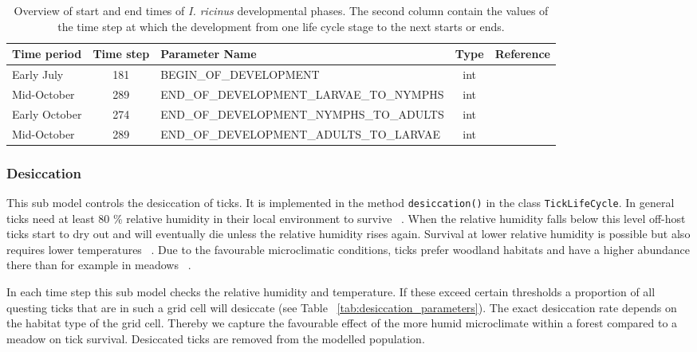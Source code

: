 \documentclass[a4paper, 11pt]{scrartcl}
\newcommand{\inlinecode}[1]{\texttt{\small #1}}
\begin{document}
\begin{table}[h!]
\caption[Overview of start and end times of \emph{I. ricinus} developmental phases.]{Overview of start and end times of \emph{I. ricinus} developmental phases. The second column contain the values of the time step at which the development from one life cycle stage to the next starts or ends.}
\label{tab:development_parameters}
\begin{tabularx}{\textwidth}{lclcl}
\toprule
\textbf{Time period} 	& \textbf{Time step} & \textbf{Parameter Name}							& \textbf{Type}    & \textbf{Reference} \\
\midrule
Early July   			& 181   			 & \tiny{BEGIN\_OF\_DEVELOPMENT}					& int      & \cite{Kahl}   		\\
Mid-October     		& 289      			 & \tiny{END\_OF\_DEVELOPMENT\_LARVAE\_TO\_NYMPHS}	& int      & \cite{Kahl}      	\\
Early October    		& 274    			 & \tiny{END\_OF\_DEVELOPMENT\_NYMPHS\_TO\_ADULTS}	& int      & \cite{Kahl}     	\\
Mid-October     		& 289      			 & \tiny{END\_OF\_DEVELOPMENT\_ADULTS\_TO\_LARVAE}	& int      & \cite{Kahl}			\\
\bottomrule
\end{tabularx}
\end{table}

\subsubsection{Desiccation}
This sub model controls the desiccation of ticks. It is implemented in the method \inlinecode{desiccation()} in the class \inlinecode{TickLifeCycle}. In general ticks need at least 80 \% relative humidity in their local environment to survive ~\parencite{Medlock.2013, Gray.2016, Hauser.2018}. When the relative humidity falls below this level off-host ticks start to dry out and will eventually die unless the relative humidity rises again. Survival at lower relative humidity is possible but also requires lower temperatures ~\parencite{Ostfeld.2015}. Due to the favourable microclimatic conditions, ticks prefer woodland habitats and have a higher abundance there than for example in meadows ~\parencite{Lindstrom.2003, Boehnke.2015}.

In each time step this sub model checks the relative humidity and temperature. If these exceed certain thresholds a proportion of all questing ticks that are in such a grid cell will desiccate (see Table ~\ref{tab:desiccation_parameters}). The exact desiccation rate depends on the habitat type of the grid cell. Thereby we capture the favourable effect of the more humid microclimate within a forest compared to a meadow on tick survival. Desiccated ticks are removed from the modelled population.
\end{document}
